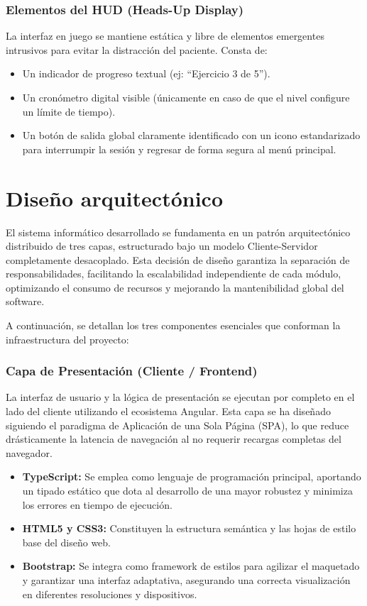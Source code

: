 \subsubsection{Elementos del HUD (Heads-Up Display)}
La interfaz en juego se mantiene estática y libre de elementos emergentes intrusivos para evitar la distracción del paciente. Consta de:
\begin{itemize}
    \item Un indicador de progreso textual (ej: ``Ejercicio 3 de 5'').
    \item Un cronómetro digital visible (únicamente en caso de que el nivel configure un límite de tiempo).
    \item Un botón de salida global claramente identificado con un icono estandarizado para interrumpir la sesión y regresar de forma segura al menú principal.
\end{itemize}


\section{Diseño arquitectónico}
El sistema informático desarrollado se fundamenta en un patrón arquitectónico distribuido de tres capas, estructurado bajo un modelo Cliente-Servidor completamente desacoplado. Esta decisión de diseño garantiza la separación de responsabilidades, facilitando la escalabilidad independiente de cada módulo, optimizando el consumo de recursos y mejorando la mantenibilidad global del software.

A continuación, se detallan los tres componentes esenciales que conforman la infraestructura del proyecto:

\subsubsection{Capa de Presentación (Cliente / Frontend)}
La interfaz de usuario y la lógica de presentación se ejecutan por completo en el lado del cliente utilizando el ecosistema Angular. Esta capa se ha diseñado siguiendo el paradigma de Aplicación de una Sola Página (SPA), lo que reduce drásticamente la latencia de navegación al no requerir recargas completas del navegador.

\begin{itemize}
    \item \textbf{TypeScript:} Se emplea como lenguaje de programación principal, aportando un tipado estático que dota al desarrollo de una mayor robustez y minimiza los errores en tiempo de ejecución.
    \item \textbf{HTML5 y CSS3:} Constituyen la estructura semántica y las hojas de estilo base del diseño web.
    \item \textbf{Bootstrap:} Se integra como framework de estilos para agilizar el maquetado y garantizar una interfaz adaptativa, asegurando una correcta visualización en diferentes resoluciones y dispositivos.
\end{itemize}

